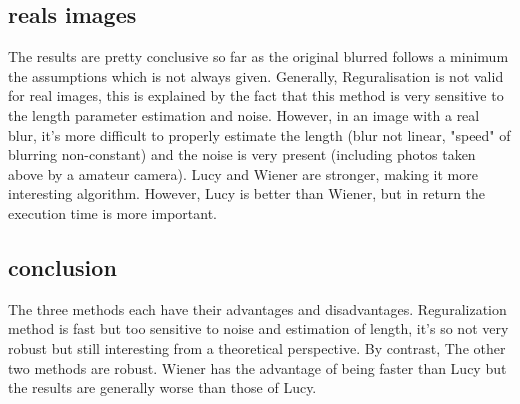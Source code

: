\subsection{reals images}

 
The results are pretty conclusive so far as the original blurred follows a minimum the assumptions which is not always given. Generally, Reguralisation is not valid for real images, this is explained by the fact that this method is very sensitive to the length parameter estimation and noise. However, in an image with a real blur, it's more difficult to properly estimate the length (blur not linear, "speed" of blurring non-constant) and the noise is very present (including photos taken above by a amateur camera). Lucy and Wiener are stronger, making it more interesting algorithm. However, Lucy is better than Wiener, but in return the execution time is more important.

\subsection{conclusion}

The three methods each have their advantages and disadvantages. Reguralization method is fast but too sensitive to noise and estimation of length, it's so not very robust but still interesting from a theoretical perspective. By contrast, The other two methods are robust. Wiener has the advantage of being faster than Lucy but the results are generally worse than those of Lucy.
